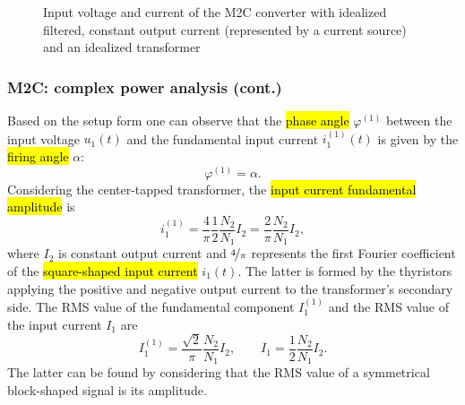 \begin{frame}[c]
\begin{figure}
		\caption{Input voltage and current of the M2C converter with idealized filtered, constant output current (represented by a current source) and an idealized transformer}
		\label{fig:M2C_inputs}
	\end{figure}
\end{frame}

\begin{frame}[c]
	\frametitle{M2C: complex power analysis (cont.)}
	Based on the setup form  one can observe that the \hl{phase angle} $\varphi^{(1)}$ between the input voltage $u_1(t)$ and the fundamental input current $i^{(1)}_1(t)$ is given by the \hl{firing angle} $\alpha$:
	$$
		\varphi^{(1)} = \alpha.
	$$\pause
	Considering the center-tapped transformer, the \hl{input current fundamental amplitude} is
	\begin{equation}
		i^{(1)}_1 = \frac{4}{\pi} \frac{1}{2}\frac{N_2}{N_1} I_2 = \frac{2}{\pi} \frac{N_2}{N_1} I_2,
	\end{equation}
	where $I_2$ is constant output current and $\nicefrac{4}{\pi}$ represents the first Fourier coefficient of the \hl{square-shaped input current} $i_1(t)$. \pause The latter is formed by the thyristors applying the positive and negative output current to the transformer's secondary side. \pause The RMS value of the fundamental component $I^{(1)}_1$ and the RMS value of the input current $I_1$ are
	\begin{equation}
		I^{(1)}_1 = \frac{\sqrt{2}}{\pi} \frac{N_2}{N_1} I_2, \qquad I_1 = \frac{1}{2}\frac{N_2}{N_1} I_2.
	\end{equation}\pause
	The latter can be found by considering that the RMS value of a symmetrical block-shaped signal is its amplitude.
\end{frame}

